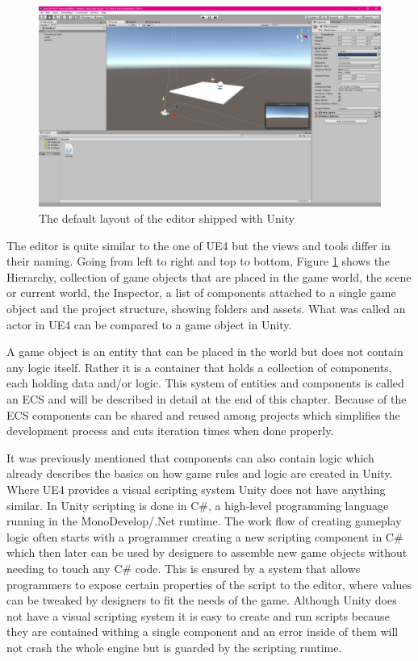 \begin{figure}[h!]
	\includegraphics[width=\linewidth]{PICs/unity_ed.png}
	\caption{The default layout of the editor shipped with Unity}
	\label{fig:unity_ed}
\end{figure}

\noindent
The editor is quite similar to the one of \ac{UE4} but the views and tools differ in their naming. Going from left to right and top to bottom, Figure \ref{fig:unity_ed} shows the Hierarchy, collection of game objects that are placed in the game world, the scene or current world, the Inspector, a list of components attached to a single game object and the project structure, showing folders and assets. What was called an actor in \ac{UE4} can be compared to a game object in Unity. 

A game object is an entity that can be placed in the world but does not contain any logic itself. Rather it is a container that holds a collection of components, each holding data and/or logic. This system of entities and components is called an \acl{ECS} and will be described in detail at the end of this chapter. Because of the \ac{ECS} components can be shared and reused among projects which simplifies the development process and cuts iteration times when done properly.

It was previously mentioned that components can also contain logic which already describes the basics on how game rules and logic are created in Unity. Where \ac{UE4} provides a visual scripting system Unity does not have anything similar. In Unity scripting is done in C\#, a high-level programming language running in the MonoDevelop/.Net runtime. The work flow of creating gameplay logic often starts with a programmer creating a new scripting component in C\# which then later can be used by designers to assemble new game objects without needing to touch any C\# code. This is ensured by a system that allows programmers to expose certain properties of the script to the editor, where values can be tweaked by designers to fit the needs of the game. Although Unity does not have a visual scripting system it is easy to create and run scripts because they are contained withing a single component and an error inside of them will not crash the whole engine but is guarded by the scripting runtime.

